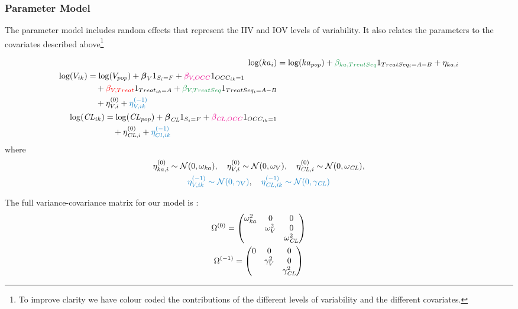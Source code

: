 \subsubsection{Parameter Model}

The parameter model includes random effects that represent the IIV and
{\color{lightblue}IOV} levels of variability. It also relates the
parameters to the covariates described above\footnote{To improve
  clarity we have colour coded the contributions of the different levels
of variability and the different covariates.}

\begin{align}
\log(ka_{i}) &= \log(ka_{pop}) +
{\color{mediumgreen}\beta_{ka,TreatSeq}}1_{TreatSeq_i=A-B} +
\eta_{ka,i} \label{eqn:eg6-param-ka}\\
\begin{split}
\log(V_{ik}) &= \log(V_{pop}) + {\boldsymbol \beta_V}1_{S_i=F} +
{\color{magenta}\beta_{V,OCC}} 1_{OCC_{ik}=1} \\
&\quad+ {\color{red}\beta_{V,Treat}}1_{Treat_{ik}=A} + {\color{mediumgreen}\beta_{V,TreatSeq}}1_{TreatSeq_i=A-B} \\
		& \quad+ \eta_{V,i}^{(0)} +  {\color{lightblue} \eta_{V,ik}^{(-1)} }
\end{split} \label{eqn:eg6-parameter-v}\\
\begin{split}
\log(\CL_{ik}) &= \log(\CL_{pop}) + {\boldsymbol \beta_{\CL}}1_{S_i=F}
+ {\color{magenta}\beta_{\CL,OCC}} 1_{OCC_{ik}=1}\\
&\quad + \eta_{\CL,i}^{(0)} + {\color{lightblue} \eta_{Cl,ik}^{(-1)} }
\end{split}\nonumber
\end{align}
where
\begin{gather*}
\eta_{ka,i}^{(0)} \sim \mathcal{N}(0, \omega_{ka}), \quad \eta_{V,i}^{(0)} \sim \mathcal{N}(0, \omega_{V}), \quad \eta_{\CL,i}^{(0)} \sim \mathcal{N}(0, \omega_{\CL}),  \\
 {\color{lightblue} \eta_{V,ik}^{(-1)} \sim \mathcal{N}(0,\gamma_V)}, \quad
 {\color{lightblue} \eta_{\CL,ik}^{(-1)} \sim \mathcal{N}(0, \gamma_{\CL})}
\end{gather*}

The full variance-covariance matrix for our model is :
\begin{gather}
 \Omega^{(0)} =
 \begin{pmatrix}
  \omega_{ka}^2 	& 0 				& 0  \\
   			  	& \omega_{V}^2	& 0 	\\
  				& 				& \omega_{\mathit{CL}}^2\\
 \end{pmatrix}\label{eqn:eg6-covariance-mat}\\
 \Omega^{(-1)} =
 \begin{pmatrix}
0 & 0 & 0\\
 & \gamma_{V}^2	& 0 	\\
 & & \gamma_{\mathit{CL}}^2\\
 \end{pmatrix}\label{eqn:eg6-gamma-mat}
\end{gather}


